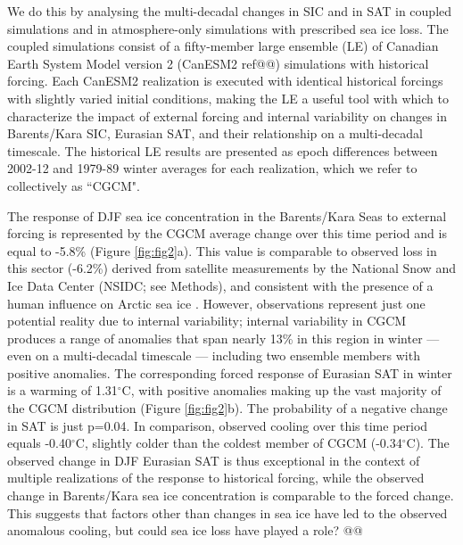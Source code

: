 \documentclass{nature}
\begin{document}
We do this by analysing the multi-decadal changes in SIC and in SAT in coupled simulations and in atmosphere-only simulations with prescribed sea ice loss. The coupled simulations consist of a fifty-member large ensemble (LE) of Canadian Earth System Model version 2 (CanESM2 ref@@) simulations with historical forcing. Each CanESM2 realization is executed with identical historical forcings with slightly varied initial conditions, making the LE a useful tool with which to characterize the impact of external forcing and internal variability on changes in Barents/Kara SIC, Eurasian SAT, and their relationship on a multi-decadal timescale. The historical LE results are presented as epoch differences between 2002-12 and 1979-89 winter averages for each realization, which we refer to collectively as ``CGCM". 

The response of DJF sea ice concentration in the Barents/Kara Seas to external forcing is represented by the CGCM average change over this time period and is equal to -5.8\% (Figure \ref{fig:fig2}a). This value is comparable to observed loss in this sector (-6.2\%) derived from satellite measurements by the National Snow and Ice Data Center (NSIDC; see Methods), and consistent with the presence of a human influence on Arctic sea ice \cite{min08}. However, observations represent just one potential reality due to internal variability; internal variability in CGCM produces a range of anomalies that span nearly 13\% in this region in winter --- even on a multi-decadal timescale --- including two ensemble members with positive anomalies. The corresponding forced response of Eurasian SAT in winter is a warming of 1.31$^\circ$C, with positive anomalies making up the vast majority of the CGCM distribution  (Figure \ref{fig:fig2}b). The probability of a negative change in SAT is just p=0.04. In comparison, observed cooling over this time period equals -0.40$^\circ$C, slightly colder than the coldest member of CGCM (-0.34$^\circ$C). The observed change in DJF Eurasian SAT is thus exceptional in the context of multiple realizations of the response to historical forcing, while the observed change in Barents/Kara sea ice concentration is comparable to the forced change. This suggests that factors other than changes in sea ice have led to the observed anomalous cooling, but could sea ice loss have played a role? @@ %
\end{document}
